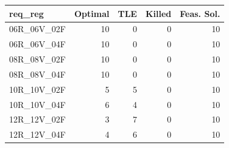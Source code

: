 
\begin{tabular}{lrrrr}
\toprule
req\_reg & Optimal & TLE & Killed & Feas. Sol.\\
\midrule
06R\_06V\_02F & 10 & 0 & 0 & 10\\
06R\_06V\_04F & 10 & 0 & 0 & 10\\
08R\_08V\_02F & 10 & 0 & 0 & 10\\
08R\_08V\_04F & 10 & 0 & 0 & 10\\
10R\_10V\_02F & 5 & 5 & 0 & 10\\
\addlinespace
10R\_10V\_04F & 6 & 4 & 0 & 10\\
12R\_12V\_02F & 3 & 7 & 0 & 10\\
12R\_12V\_04F & 4 & 6 & 0 & 10\\
\bottomrule
\end{tabular}
